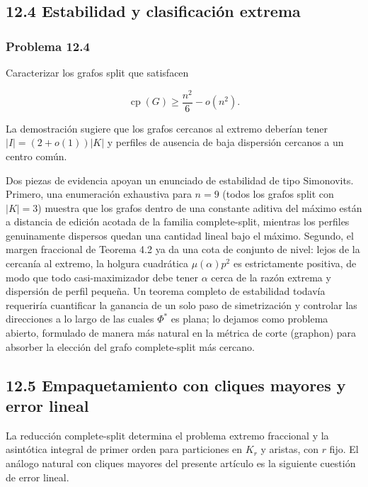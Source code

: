 \documentclass[
  11pt,
]{article}
\begin{document}
\subsection{12.4 Estabilidad y clasificación
extrema}\label{estabilidad-y-clasificaciuxf3n-extrema}

\subsubsection{Problema 12.4}\label{problema-12.4}

Caracterizar los grafos split que satisfacen

\[
\operatorname{cp}(G)
\ge
\frac{n^2}{6}-o(n^2).
\]

La demostración sugiere que los grafos cercanos al extremo deberían
tener \(|I|=(2+o(1))|K|\) y perfiles de ausencia de baja dispersión
cercanos a un centro común.

Dos piezas de evidencia apoyan un enunciado de estabilidad de tipo
Simonovits. Primero, una enumeración exhaustiva para \(n=9\) (todos los
grafos split con \(|K|=3\)) muestra que los grafos dentro de una
constante aditiva del máximo están a distancia de edición acotada de la
familia complete-split, mientras los perfiles genuinamente dispersos
quedan una cantidad lineal bajo el máximo. Segundo, el margen fraccional
de Teorema 4.2 ya da una cota de conjunto de nivel: lejos de la cercanía
al extremo, la holgura cuadrática \(\mu(\alpha)p^2\) es estrictamente
positiva, de modo que todo casi-maximizador debe tener \(\alpha\) cerca
de la razón extrema y dispersión de perfil pequeña. Un teorema completo
de estabilidad todavía requeriría cuantificar la ganancia de un solo
paso de simetrización y controlar las direcciones a lo largo de las
cuales \(\Phi^*\) es plana; lo dejamos como problema abierto, formulado
de manera más natural en la métrica de corte (graphon) para absorber la
elección del grafo complete-split más cercano.

\subsection{12.5 Empaquetamiento con cliques mayores y error
lineal}\label{empaquetamiento-con-cliques-mayores-y-error-lineal}

La reducción complete-split determina el problema extremo fraccional y
la asintótica integral de primer orden para particiones en \(K_r\) y
aristas, con \(r\) fijo. El análogo natural con cliques mayores del
presente artículo es la siguiente cuestión de error lineal.
\end{document}
